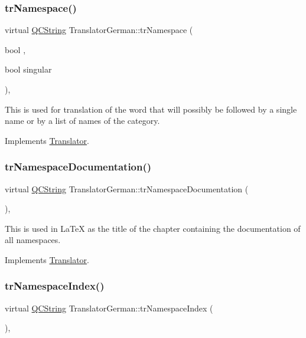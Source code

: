 \subsubsection{\texorpdfstring{trNamespace()}{trNamespace()}}
{\footnotesize\ttfamily virtual \mbox{\hyperlink{class_q_c_string}{Q\+C\+String}} Translator\+German\+::tr\+Namespace (\begin{DoxyParamCaption}\item[{bool}]{,  }\item[{bool}]{singular }\end{DoxyParamCaption})\hspace{0.3cm}{\ttfamily [inline]}, {\ttfamily [virtual]}}

This is used for translation of the word that will possibly be followed by a single name or by a list of names of the category. 

Implements \mbox{\hyperlink{class_translator}{Translator}}.

\mbox{\label{class_translator_german_a77017eaefec5125490f0bd9e44d8ca5e}} 
\subsubsection{\texorpdfstring{trNamespaceDocumentation()}{trNamespaceDocumentation()}}
{\footnotesize\ttfamily virtual \mbox{\hyperlink{class_q_c_string}{Q\+C\+String}} Translator\+German\+::tr\+Namespace\+Documentation (\begin{DoxyParamCaption}{ }\end{DoxyParamCaption})\hspace{0.3cm}{\ttfamily [inline]}, {\ttfamily [virtual]}}

This is used in La\+TeX as the title of the chapter containing the documentation of all namespaces. 

Implements \mbox{\hyperlink{class_translator}{Translator}}.

\mbox{\label{class_translator_german_a39552656f64ffd569576884575bbf852}} 
\subsubsection{\texorpdfstring{trNamespaceIndex()}{trNamespaceIndex()}}
{\footnotesize\ttfamily virtual \mbox{\hyperlink{class_q_c_string}{Q\+C\+String}} Translator\+German\+::tr\+Namespace\+Index (\begin{DoxyParamCaption}{ }\end{DoxyParamCaption})\hspace{0.3cm}{\ttfamily [inline]}, {\ttfamily [virtual]}}


